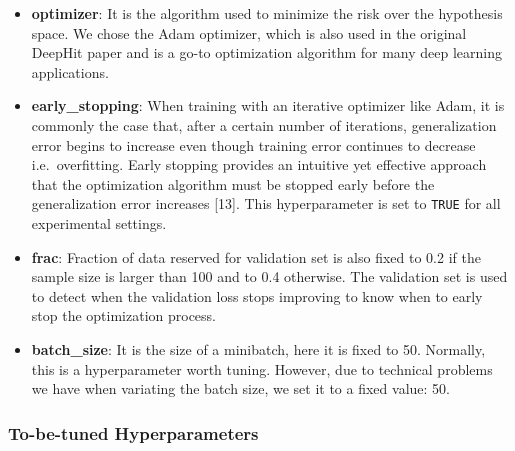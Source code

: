 \documentclass[
]{article}
\providecommand{\tightlist}{%
  \setlength{\itemsep}{0pt}\setlength{\parskip}{0pt}}
\begin{document}
\begin{itemize}
\tightlist
\item
  \textbf{optimizer}: It is the algorithm used to minimize the risk over the hypothesis space. We chose the Adam optimizer, which is also used in the original DeepHit paper and is a go-to optimization algorithm for many deep learning applications.
\item
  \textbf{early\_stopping}: When training with an iterative optimizer like Adam, it is commonly the case that, after a certain number of iterations, generalization error begins to increase even though training error continues to decrease i.e.~overfitting. Early stopping provides an intuitive yet effective approach that the optimization algorithm must be stopped early before the generalization error increases {[}13{]}. This hyperparameter is set to \texttt{TRUE} for all experimental settings.
\item
  \textbf{frac}: Fraction of data reserved for validation set is also fixed to 0.2 if the sample size is larger than 100 and to 0.4 otherwise. The validation set is used to detect when the validation loss stops improving to know when to early stop the optimization process.
\item
  \textbf{batch\_size}: It is the size of a minibatch, here it is fixed to 50. Normally, this is a hyperparameter worth tuning. However, due to technical problems we have when variating the batch size, we set it to a fixed value: 50.
\end{itemize}

\hypertarget{to-be-tuned-hyperparameters}{%
\subsubsection{To-be-tuned Hyperparameters}\label{to-be-tuned-hyperparameters}}
\end{document}
